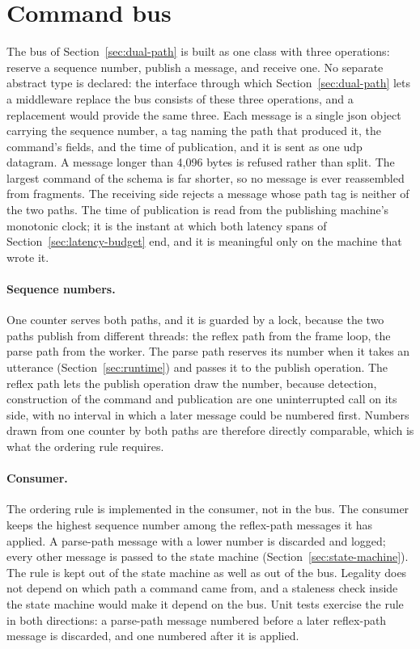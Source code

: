 \section{Command bus}
\label{sec:command-bus}
The bus of Section~\ref{sec:dual-path} is built as one class with three operations: reserve a
sequence number, publish a message, and receive one. No separate abstract type is declared: the
interface through which Section~\ref{sec:dual-path} lets a middleware replace the bus consists of
these three operations, and a replacement would provide the same three. Each message is a single \gls{json} object
carrying the sequence number, a tag naming the path that produced it, the command's fields, and the
time of publication, and it is sent as one \gls{udp} datagram. A message longer than 4{,}096 bytes is
refused rather than split. The largest command of the schema is far shorter, so no message is ever
reassembled from fragments. The receiving side rejects a message whose path tag is neither of the
two paths. The time of publication is read from the publishing machine's monotonic clock; it is the
instant at which both latency spans of Section~\ref{sec:latency-budget} end, and it is meaningful
only on the machine that wrote it.

\paragraph{Sequence numbers.} One counter serves both paths, and it is guarded by a lock, because
the two paths publish from different threads: the reflex path from the frame loop, the parse path
from the worker. The parse path reserves its number when it takes an utterance
(Section~\ref{sec:runtime}) and passes it to the publish operation. The reflex path lets the
publish operation draw the number, because detection, construction of the command and publication
are one uninterrupted call on its side, with no interval in which a later message could be
numbered first. Numbers drawn from one counter by both paths are therefore directly comparable,
which is what the ordering rule requires.

\paragraph{Consumer.} The ordering rule is implemented in the consumer, not in the bus. The consumer
keeps the highest sequence number among the reflex-path messages it has applied. A parse-path
message with a lower number is discarded and logged; every other message is passed to the state
machine (Section~\ref{sec:state-machine}). The rule is kept out of the state machine as well as out
of the bus. Legality does not depend on which path a command came from, and a staleness check
inside the state machine would make it depend on the bus. Unit tests exercise the rule in both
directions: a parse-path message numbered before a later reflex-path message is discarded, and one
numbered after it is applied.

